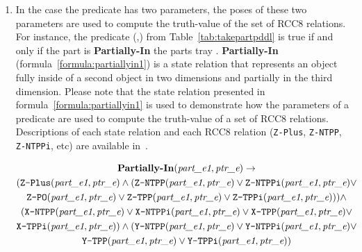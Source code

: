 \begin{enumerate}
\item In the case the predicate has two parameters, the poses of these two parameters are used to compute the truth-value of the set of RCC8 relations. For instance, the predicate (,) from Table~\ref{tab:takepartpddl} is true if and only if the part  is \textbf{Partially-In} the parts tray .  \textbf{Partially-In} (formula~\ref{formula:partiallyin1}) is a state relation that represents an object fully inside of a second object in two dimensions and partially in the third dimension. Please note that the state relation presented in formula~\ref{formula:partiallyin1} is used to demonstrate how the parameters of a predicate are used to compute the truth-value of a set of RCC8 relations. Descriptions of each state relation and each RCC8 relation (\texttt{Z-Plus}, \texttt{Z-NTPP}, \texttt{Z-NTPPi}, etc) are available in~\cite{SCHLENOFF.RAS.2013}.


\begin{gather}
\label{formula:partiallyin1}
\textbf{Partially-In}(\textit{part\_e1}, \textit{ptr\_e}) \rightarrow   \\
(\texttt{Z-Plus}(\textit{part\_e1}, \textit{ptr\_e}) \wedge (\texttt{Z-NTPP}(\textit{part\_e1}, \textit{ptr\_e}) \vee \texttt{Z-NTPPi}(\textit{part\_e1}, \textit{ptr\_e}) \vee  \notag\\\texttt{Z-PO}(\textit{part\_e1}, \textit{ptr\_e}) \vee \texttt{Z-TPP}(\textit{part\_e1}, \textit{ptr\_e}) \vee \texttt{Z-TPPi}(\textit{part\_e1}, \textit{ptr\_e}))) \wedge \notag\\
(\texttt{X-NTPP}(\textit{part\_e1}, \textit{ptr\_e}) \vee \texttt{X-NTPPi}(\textit{part\_e1}, \textit{ptr\_e}) \vee \texttt{X-TPP}(\textit{part\_e1}, \textit{ptr\_e}) \vee  \notag\\ \texttt{X-TPPi}(\textit{part\_e1}, \textit{ptr\_e}))\wedge
(\texttt{Y-NTPP}(\textit{part\_e1}, \textit{ptr\_e}) \vee \texttt{Y-NTPPi}(\textit{part\_e1}, \textit{ptr\_e}) \vee  \notag\\ \texttt{Y-TPP}(\textit{part\_e1}, \textit{ptr\_e}) \vee \texttt{Y-TPPi}(\textit{part\_e1}, \textit{ptr\_e})) \notag
\end{gather}


\end{enumerate}
